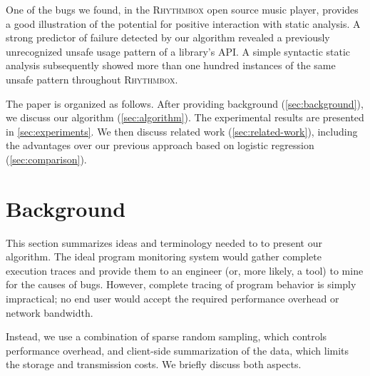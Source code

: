 \documentclass[draft]{sig-alternate}
\newcommand{\rhythmbox}{\textsc{Rhythmbox}\xspace}
\begin{document}
One of the bugs we found, in the \rhythmbox open source music player,
provides a good illustration of the potential for positive interaction
with static analysis.  A strong predictor of failure detected by our
algorithm revealed a previously unrecognized unsafe usage pattern of a
library's API\@.  A simple syntactic static analysis subsequently showed
more than one hundred instances of the same unsafe pattern throughout
\rhythmbox.

The paper is organized as follows.  After providing background
(\autoref{sec:background}), we discuss our algorithm
(\autoref{sec:algorithm}). The experimental results are presented in
\autoref{sec:experiments}.  We then discuss related
work (\autoref{sec:related-work}), including the advantages over our
previous approach based on logistic regression
(\autoref{sec:comparison}).


\section{Background}
\label{sec:background}

This section summarizes ideas and terminology needed to to present our
algorithm.  The ideal program monitoring system would gather complete
execution traces and provide them to an engineer (or, more likely, a
tool) to mine for the causes of bugs.  However, complete tracing of
program behavior is simply impractical; no end user would accept the
required performance overhead or network bandwidth.

Instead, we use a combination of sparse random sampling, which controls
performance overhead, and client-side summarization of the data, which
limits the storage and transmission costs.  We briefly discuss
both aspects.
\end{document}
